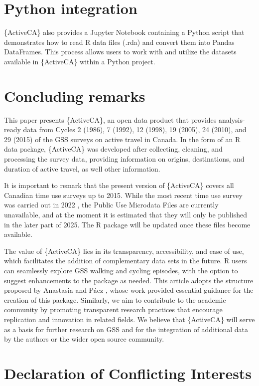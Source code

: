 \documentclass[Royal,times,sageh]{sagej}
\begin{document}
\section{Python integration}\label{python-integration}

\{ActiveCA\} also provides a Jupyter Notebook containing a Python script
that demonstrates how to read R data files (.rda) and convert them into
Pandas DataFrames. This process allows users to work with and utilize
the datasets available in \{ActiveCA\} within a Python project.

\section{Concluding remarks}\label{concluding-remarks}

This paper presents \{ActiveCA\}, an open data product that provides
analysis-ready data from Cycles 2 (1986), 7 (1992), 12 (1998), 19
(2005), 24 (2010), and 29 (2015) of the GSS surveys on active travel in
Canada. In the form of an R data package, \{ActiveCA\} was developed
after collecting, cleaning, and processing the survey data, providing
information on origins, destinations, and duration of active travel, as
well other information.

It is important to remark that the present version of \{ActiveCA\}
covers all Canadian time use surveys up to 2015. While the most recent
time use survey was carried out in 2022 \citep{wray2024}, the Public Use
Microdata Files are currently unavailable, and at the moment it is
estimated that they will only be published in the later part of 2025.
The R package will be updated once these files become available.

The value of \{ActiveCA\} lies in its transparency, accessibility, and
ease of use, which facilitates the addition of complementary data sets
in the future. R users can seamlessly explore GSS walking and cycling
episodes, with the option to suggest enhancements to the package as
needed. This article adopts the structure proposed by Anastasia and Páez
\citeyearpar{soukhov2023}, whose work provided essential guidance for
the creation of this package. Similarly, we aim to contribute to the
academic community by promoting transparent research practices that
encourage replication and innovation in related fields. We believe that
\{ActiveCA\} will serve as a basis for further research on GSS and for
the integration of additional data by the authors or the wider open
source community.

\section{Declaration of Conflicting
Interests}\label{declaration-of-conflicting-interests}
\end{document}
